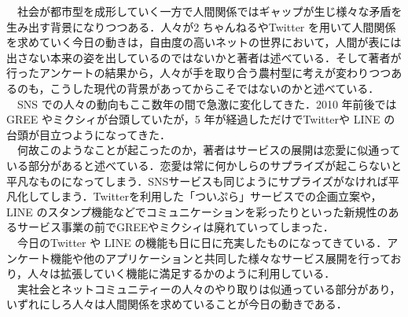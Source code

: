 \documentclass[uplatex,twocolumn,dvipdfmx]{jsarticle}
\begin{document}
　社会が都市型を成形していく一方で人間関係ではギャップが生じ様々な矛盾を生み出す背景になりつつある．人々が2 ちゃんねるやTwitter を用いて人間関係を求めていく今日の動きは，自由度の高いネットの世界において，人間が表には出さない本来の姿を出しているのではないかと著者は述べている．そして著者が行ったアンケートの結果から，人々が手を取り合う農村型に考えが変わりつつあるのも，こうした現代の背景があってからこそではないのかと述べている．\\
　SNS での人々の動向もここ数年の間で急激に変化してきた．2010 年前後では GREE やミクシィが台頭していたが，5 年が経過しただけでTwitterや LINE の台頭が目立つようになってきた．\\
　何故このようなことが起こったのか，著者はサービスの展開は恋愛に似通っている部分があると述べている．恋愛は常に何かしらのサプライズが起こらないと平凡なものになってしまう．SNSサービスも同じようにサプライズがなければ平凡化してしまう．Twitterを利用した「ついぷら」サービスでの企画立案や，LINE のスタンプ機能などでコミュニケーションを彩ったりといった新規性のあるサービス事業の前でGREEやミクシィは廃れていってしまった．\\
　今日のTwitter や LINE の機能も日に日に充実したものになってきている．アンケート機能や他のアプリケーションと共同した様々なサービス展開を行っており，人々は拡張していく機能に満足するかのように利用している．\\
　実社会とネットコミュニティーの人々のやり取りは似通っている部分があり，いずれにしろ人々は人間関係を求めていることが今日の動きである．
\end{document}
